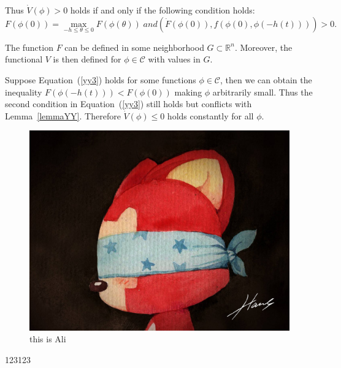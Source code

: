 \documentclass[fontset=windows]{article}
\begin{document}
Thus $\dot{V}\left(\phi\right)>0$ holds if and only if the following condition holds:
\begin{equation}
  F(\phi (0)) = \mathop {\max }\limits_{ - h \le \theta  \le 0} F(\phi (\theta ))\;and(\dot F(\phi (0)),f(\phi(0), \phi(-h(t)))) > 0.
  \label{yy3}
\end{equation}

The function $F$ can be defined in some neighborhood $G\subset\mathbb{R}^n$. Moreover, the functional $V$ is then defined for $\phi\in\mathcal{C}$ with values in $G$.

Suppose Equation~(\ref{yy3}) holds for some functions $\phi\in\mathcal{C}$, then we can obtain the inequality $F\left(\phi\left(-h\left(t\right)\right)\right)<F\left(\phi\left(0\right)\right)$ making $\phi$ arbitrarily small. Thus the second condition in Equation~(\ref{yy3}) still holds but conflicts with Lemma~\ref{lemmaYY}. Therefore $\dot{V}\left(\phi\right)\le0$ holds constantly for all $\phi$.



\begin{figure}[htbp]
  \centering
  \includegraphics[scale=0.2]{Ali.jpg}
  \caption{this is Ali}
  \label{1}
\end{figure}
123123


\end{document}
